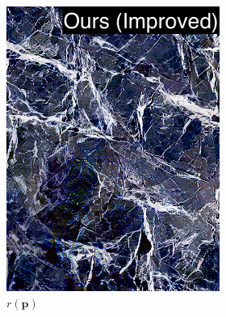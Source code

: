 \begin{figure}[]
\begin{subfigure}{\textwidth}
\begin{subfigure}{0.24\textwidth}
            \includegraphics[width=\textwidth]{images/04-experiment02/human/marble/improved_proj_label.jpg}
            \caption*{\(r(\bm{p})\)}
        \end{subfigure}
        \hfill
        \begin{subfigure}{0.24\textwidth}
            \centering

\end{subfigure}
\end{subfigure}
\end{figure}
